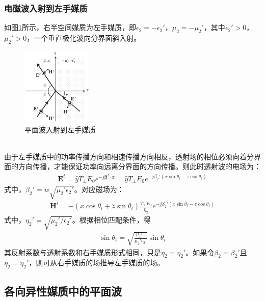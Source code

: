 \documentclass{article}
\numberwithin{equation}{section}
\renewcommand{\vec}[1]{\boldsymbol{#1}}
\begin{document}
\subsubsection{电磁波入射到左手媒质}
如图\ref{fig:fig46}所示，右半空间媒质为左手媒质，即$\epsilon_2=-\epsilon_2'$，$\mu_2=-\mu_2'$，其中$\epsilon_2'>0$，$\mu_2'>0$，一个垂直极化波向分界面斜入射。
\begin{figure}[ht]
    \centering
    \includegraphics[width=0.3\textwidth]{平面波入射到左手媒质.PNG}
    \caption{平面波入射到左手媒质}
    \label{fig:fig46}
\end{figure}
\\
由于左手媒质中的功率传播方向和相速传播方向相反，透射场的相位必须向着分界面的方向传播，才能保证功率向远离分界面的方向传播。则此时透射波的电场为：
\begin{align}
    \label{eq:eq450}
    \mathbf{E}^t=\hat{y}T_{\perp}E_0e^{-j\vec{\beta}^t\cdot\vec{r}}=\hat{y}T_{\perp}E_0e^{-j\beta_2'(x\sin\theta_t-z\cos\theta_t)}
\end{align}
式中，$\beta_2'=w\sqrt{\mu_2'\epsilon_2'}$。对应磁场为：
\begin{align}
    \label{eq:eq451}
    \mathbf{H}^t=-(\hat{x}\cos\theta_t+\hat{z}\sin\theta_t)\frac{T_{\perp}E_0}{\eta_2}e^{-j\beta_2'(x\sin\theta_t-z\cos\theta_t)}
\end{align}
式中，$\eta_2'=\sqrt{\mu_2'/\epsilon_2'}$。根据相位匹配条件，得
\begin{align}
    \label{eq:eq452}
    \sin\theta_t=\sqrt{\frac{\mu_1\epsilon_1}{\mu_2'\epsilon_2'}}\sin\theta_i
\end{align}
其反射系数与透射系数和右手媒质形式相同，只是$\eta_2=\eta_2'$。如果令$\beta_2=\beta_2'$且$\eta_2=\eta_2'$，则可从右手媒质的场推导左手媒质的场。
\subsection{各向异性媒质中的平面波}
\end{document}
